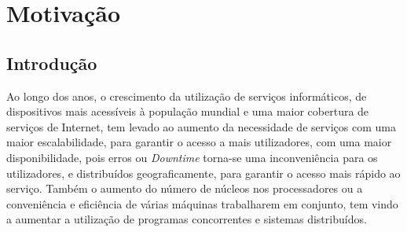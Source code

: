 \chapter{Motivação}
\label{chap:motivacao}

\section{Introdução}
\label{motivacao:sec:introducao}

Ao longo dos anos, o crescimento da utilização de serviços informáticos, de dispositivos mais acessíveis à população mundial e uma maior cobertura de serviços de Internet, 
tem levado ao aumento da necessidade de serviços com uma maior escalabilidade, para garantir o acesso a mais utilizadores, com uma maior disponibilidade, pois erros ou \emph{Downtime} torna-se uma inconveniência para os utilizadores,
e distribuídos geograficamente, para garantir o acesso mais rápido ao serviço.
Também o aumento do número de núcleos nos processadores ou a conveniência e eficiência de várias máquinas trabalharem em conjunto, tem vindo a aumentar a utilização de programas concorrentes e sistemas distribuídos.



